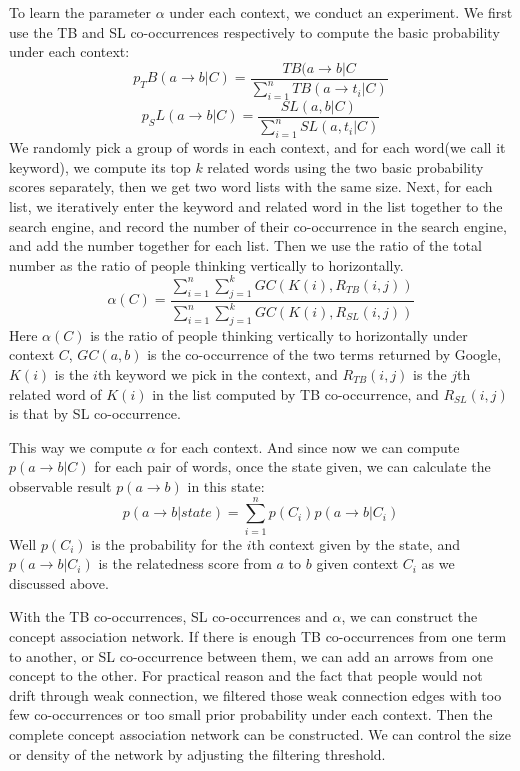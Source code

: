 To learn the parameter $\alpha$ under each context, we conduct an experiment.
We first use the TB and SL co-occurrences respectively to compute the basic
probability under each context:
\begin{equation}
p_TB(a\rightarrow b|C)=\frac{TB(a\rightarrow b|C}{\sum_{i=1}^nTB(a\rightarrow t_i|C)}
\end{equation}
\begin{equation}
p_SL(a\rightarrow b|C)=\frac{SL(a,b|C)}{\sum_{i=1}^nSL(a,t_i|C)}
\end{equation}
We randomly pick a group of words in each context, and for each word(we call it keyword),
we compute its top $k$ related words using the two basic 
probability scores separately,
then we get two word lists with the same size. Next, for each list, we iteratively
enter the keyword and related word in the list together to the search engine,
and record the number of their co-occurrence in the search engine, and add the number
together for each list. Then we use the ratio of the total number as the ratio of
people thinking vertically to horizontally.
\begin{equation}
\alpha (C)=\frac{\sum_{i=1}^n\sum_{j=1}^kGC(K(i), R_{TB}(i,j))}{\sum_{i=1}^n{\sum_{j=1}^kGC(K(i), R_{SL}(i,j))}}
\end{equation}
Here $\alpha (C)$ is the ratio of people thinking vertically to horizontally under context $C$,
$GC(a,b)$ is the co-occurrence of the two terms returned by Google, $K(i)$ is the $i$th keyword
we pick in the context, and $R_{TB}(i,j)$ is the $j$th related word of $K(i)$ in the list
computed by TB co-occurrence, and $R_{SL}(i,j)$ is that 
by SL co-occurrence.

This way we compute $\alpha$ for each context. And since now we can compute
$p(a\rightarrow b|C)$ for each pair of words, once the state given, we can
calculate the observable result $p(a\rightarrow b)$ in this state:
\begin{equation}
p(a\rightarrow b|state)=\sum_{i=1}^np(C_i)p(a\rightarrow b|C_i)
\end{equation}
Well $p(C_i)$ is the probability for the $i$th context given by the state,
and $p(a\rightarrow b|C_i)$ is the relatedness score from $a$ to $b$ given
context $C_i$ as we discussed above.

With the TB co-occurrences, SL co-occurrences and $\alpha$,
we can construct the concept association network. If there is enough 
TB co-occurrences from one term to another, 
or SL co-occurrence between them, we can add an
arrows from one concept to the other.
For practical reason and the fact that people would not drift through 
weak connection, we filtered those weak connection edges with too 
few co-occurrences or too small prior probability under each context. 
Then the complete concept association network can be constructed.
We can control the size or density of the network by adjusting 
the filtering threshold.

